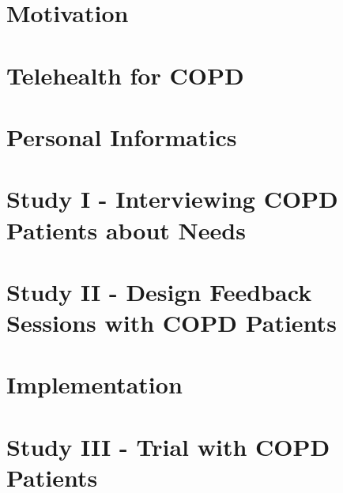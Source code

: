 
\usepackage{booktabs} %


\cleardoublepage
\cleardoublepage

\cleardoublepage

\begin{KeepFromToc}
	\tableofcontents
\end{KeepFromToc}

\chapter{Motivation}





\chapter{Telehealth for COPD}


%


\chapter{Personal Informatics}



\chapter{Study I - Interviewing COPD Patients about Needs} 



\chapter{Study II - Design Feedback Sessions with COPD Patients}


\chapter{Implementation}



\chapter{Study III - Trial with COPD Patients}


